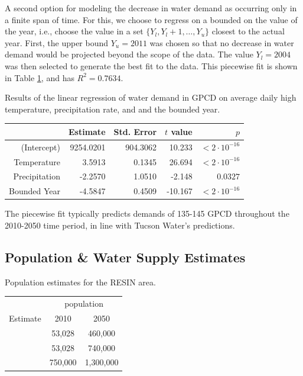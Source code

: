 \documentclass[opre,nonblindrev]{informs3} %
\begin{document}
A second option for modeling the decrease in water demand as occurring only in a finite span of time.
For this, we choose to regress on a bounded on the value of the year, i.e., choose the value in a set $\{Y_l, Y_l+1, \dots, Y_u\}$ closest to the actual year.
First, the upper bound $Y_u = 2011$ was chosen so that no decrease in water demand would be projected beyond the scope of the data.
The value $Y_l = 2004$ was then selected to generate the best fit to the data.
This piecewise fit is shown in Table \ref{tb:gpcd_piecewise_reg}, and has $R^2 = 0.7634$.

\begin{table}
	\TABLE
	{
		Results of the linear regression of water demand in GPCD on average daily high temperature, precipitation rate, and and the bounded year.
		\label{tb:gpcd_piecewise_reg}
	}
	{\begin{tabular}{rrrrr}
		\hline
						   & Estimate  & Std. Error & $t$ value & $p$ \\
		\hline
		(Intercept)    & 9254.0201 & 904.3062   & 10.233    & $<2\cdot 10^{-16}$ \\
		Temperature    & 3.5913    & 0.1345     & 26.694    & $<2\cdot 10^{-16}$ \\
		Precipitation  & -2.2570   & 1.0510     & -2.148    & $0.0327$ \\
		Bounded Year   & -4.5847   & 0.4509     & -10.167   & $<2\cdot 10^{-16}$ \\
		\hline
	\end{tabular}}
	{}
\end{table}

The piecewise fit typically predicts demands of 135-145 GPCD throughout the 2010-2050 time period, in line with Tucson Water's predictions.

\subsection{Population \& Water Supply Estimates}

\begin{table}
	\TABLE
	{
		Population estimates for the RESIN area.
		\label{tb:population}
	}
	{\begin{tabular}{lcc}
		\hline
		         & \multicolumn{2}{c}{population} \\
		Estimate & 2010 & 2050 \\
		\hline
		\cite{taz}    &  53,028 &   460,000 \\
		\cite{wisp}   &  53,028 &   740,000 \\
		\cite{tucson} & 750,000 & 1,300,000 \\
		\hline
	\end{tabular}}
	{}
\end{table}
\end{document}
